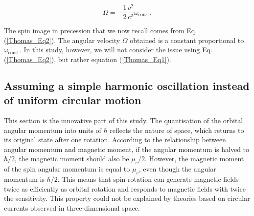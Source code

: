 \documentclass[%
 reprint,
 amsmath,amssymb,
 aps,
]{revtex4-1}
\numberwithin{equation}{section}%
\begin{document}
\begin{equation}
    {\Omega}= - \frac{1}{2} \frac{v^2}{c^2} \omega_{\mathrm{const}}.
    \label{Thomas_Eq2}
\end{equation}

The spin image in precession that we now recall comes from Eq. (\ref{Thomas_Eq2}). The angular velocity $\Omega$ obtained is a constant proportional to $\omega_{\mathrm{const}}$. In this study, however, we will not consider the issue using Eq. (\ref{Thomas_Eq2}), but rather equation (\ref{Thomas_Eq1}).


\subsection{Assuming a simple harmonic oscillation instead of uniform circular motion}



This section is the innovative part of this study. The quantisation of the orbital angular momentum into units of $\hbar$ reflects the nature of space, which returns to its original state after one rotation. According to the relationship between angular momentum and magnetic moment, if the angular momentum is halved to $\hbar/2$, the magnetic moment should also be $\mu_e/2$. However, the magnetic moment of the spin angular momentum is equal to $\mu_e$, even though the angular momentum is $\hbar/2$. This means that spin rotation can generate magnetic fields twice as efficiently as orbital rotation and responds to magnetic fields with twice the sensitivity. This property could not be explained by theories based on circular currents observed in three-dimensional space.
\end{document}
